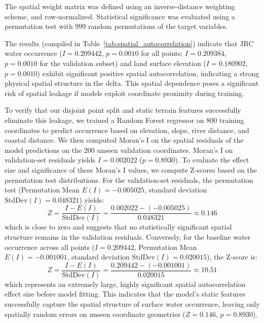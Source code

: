The spatial weight matrix was defined using an inverse-distance weighting scheme, and row-normalized. Statistical significance was evaluated using a permutation test with 999 random permutations of the target variables. 

The results (compiled in Table~\ref{tab:spatial_autocorrelation}) indicate that JRC water occurrence ($I = 0.209442$, $p = 0.0010$ for all points; $I = 0.209384$, $p = 0.0010$ for the validation subset) and land surface elevation ($I = 0.180902$, $p = 0.0010$) exhibit significant positive spatial autocorrelation, indicating a strong physical spatial structure in the delta. This spatial dependence poses a significant risk of spatial leakage if models exploit coordinate proximity during training. 

To verify that our disjoint point split and static terrain features successfully eliminate this leakage, we trained a Random Forest regressor on 800 training coordinates to predict occurrence based on elevation, slope, river distance, and coastal distance. We then computed Moran's I on the spatial residuals of the model predictions on the 200 unseen validation coordinates. Moran's I on validation-set residuals yields $I = 0.002022$ ($p = 0.8930$). To evaluate the effect size and significance of these Moran's I values, we compute Z-scores based on the permutation test distributions. For the validation-set residuals, the permutation test (Permutation Mean $E(I) = -0.005025$, standard deviation $\text{StdDev}(I) = 0.048321$) yields:
\begin{equation}
    Z = \frac{I - E(I)}{\text{StdDev}(I)} = \frac{0.002022 - (-0.005025)}{0.048321} \approx 0.146
\end{equation}
which is close to zero and suggests that no statistically significant spatial structure remains in the validation residuals. Conversely, for the baseline water occurrence across all points ($I = 0.209442$, Permutation Mean $E(I) = -0.001001$, standard deviation $\text{StdDev}(I) = 0.020015$), the Z-score is:
\begin{equation}
    Z = \frac{I - E(I)}{\text{StdDev}(I)} = \frac{0.209442 - (-0.001001)}{0.020015} \approx 10.51
\end{equation}
which represents an extremely large, highly significant spatial autocorrelation effect size before model fitting. This indicates that the model's static features successfully capture the spatial structure of surface water occurrence, leaving only spatially random errors on unseen coordinate geometries ($Z = 0.146$, $p = 0.8930$).

